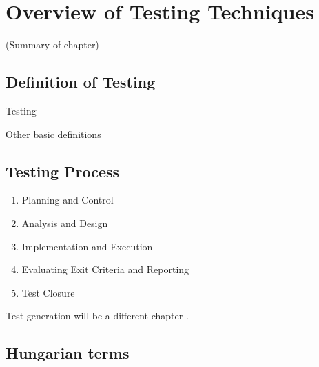 \chapter{Overview of Testing Techniques}
\label{cha:overview-of-testing}

(Summary of chapter)

\section{Definition of Testing}
\label{sec:definition-of-testing}

Testing \cite{myers-1979}

Other basic definitions

\section{Testing Process}
\label{sec:testing-process}

\begin{enumerate}
    \item Planning and Control
    \item Analysis and Design
    \item Implementation and Execution
    \item Evaluating Exit Criteria and Reporting    
    \item Test Closure
\end{enumerate}

Test generation will be a different chapter \cite{Anand13}.


\section{Hungarian terms}

